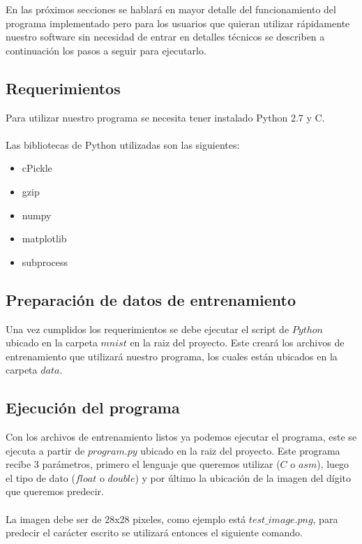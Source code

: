 
En las próximos secciones se hablará en mayor detalle del funcionamiento del programa implementado pero para los usuarios que quieran utilizar rápidamente nuestro software sin necesidad de entrar en detalles técnicos se describen a continuación los pasos a seguir para ejecutarlo.

\subsection{Requerimientos}

Para utilizar nuestro programa se necesita tener instalado Python 2.7 y C.
\\
\\
Las bibliotecas de Python utilizadas son las siguientes:

\begin{itemize}

\item cPickle
\item gzip
\item numpy
\item matplotlib
\item subprocess

\end{itemize}

\subsection{Preparación de datos de entrenamiento}

Una vez cumplidos los requerimientos se debe ejecutar el script de $Python$ ubicado en la carpeta $mnist$ en la raiz del proyecto. Este creará los archivos de entrenamiento que utilizará nuestro programa, los cuales están ubicados en la carpeta $data$.

\subsection{Ejecución del programa}

Con los archivos de entrenamiento listos ya podemos ejecutar el programa, este se ejecuta a partir de $program.py$ ubicado en la raiz del proyecto. Este programa recibe 3 parámetros, primero el lenguaje que queremos utilizar ($C$ o $asm$), luego el tipo de dato ($float$ o $double$) y por último la ubicación de la imagen del dígito que queremos predecir.
\\
\\
La imagen debe ser de 28x28 pixeles, como ejemplo está $test\_image.png$, para predecir el carácter escrito se utilizará entonces el siguiente comando.

